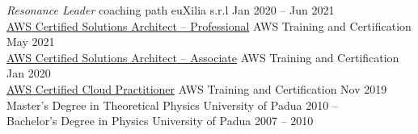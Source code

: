 \documentclass[9pt]{scrartcl}
\def\Phi{1.618}
\newlength{\Pad}\setlength{\Pad}{14.562pt} %
\begin{document}
\Event
  {\emph{Resonance Leader} coaching path}
  {euXilia s.r.l}%
  {Jan 2020 -- Jun 2021}\\
\Event
  {\href{https://www.credly.com/badges/37aaaf27-3a2e-436d-9195-db4f46eb222e/public_url}
  {%
   AWS Certified Solutions Architect -- Professional}}
  {AWS Training and Certification}
  {May 2021}\\
\Event
  {\href{https://www.credly.com/badges/d092afab-f194-4074-ade6-78728c854faa/public_url}
  {%
   AWS Certified Solutions Architect -- Associate}}
  {AWS Training and Certification}
  {Jan 2020}\\
\Event
  {\href{https://www.credly.com/badges/d268e963-65ba-462b-a835-f65a7baccccd/public_url}
  {%
   AWS Certified Cloud Practitioner}}
  {AWS Training and Certification}
  {Nov 2019}\\
\Event
  {Master's Degree in Theoretical Physics}
  {University of Padua}
  {2010 -- }\\
\Event
  {Bachelor's Degree in Physics}
  {University of Padua}
  {2007 -- 2010}\\
\end{document}
